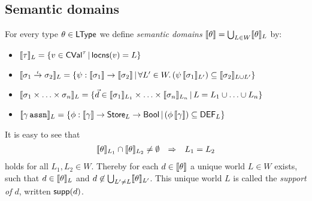 \documentclass[12pt,a4paper]{report}
\newcommand{\CVal}{\sstyle{CVal}}
\newcommand{\DEF}{\sstyle{DEF}}
\begin{document}

\subsection{Semantic domains}

\begin{definition}
  For every type $\theta\in\mathsf{LType}$ we define {\em semantic domains}
  $\llbracket\theta\rrbracket = \bigcup_{L \in W} \llbracket\theta\rrbracket_L$ by:
  \begin{itemize}
    \item $\semantic{\tau}_L = \{v\in\CVal^\tau\,|\,\locns{v} = L\}$
    \item $\llbracket\sigma_1\stackrel{_t}{\to}\sigma_2\rrbracket_L = \{\psi: \llbracket\sigma_1\rrbracket \to \llbracket\sigma_2\rrbracket\,|\,
              \forall L'\in W.\,(\psi\,\llbracket\sigma_1\rrbracket_{L'}) \subseteq \llbracket\sigma_2\rrbracket_{L \cup L'}\}$
    \item $\llbracket\sigma_1 \times \ldots \times \sigma_n\rrbracket_L =
      \{\vec{d} \in \llbracket\sigma_1\rrbracket_{L_1} \times \ldots \times \llbracket\sigma_n\rrbracket_{L_n}\,|\,
      L = L_1 \cup \ldots \cup L_n\}$
    \item $\semantic{\gamma\,\tassn}_L =
      \{\phi:\semantic{\gamma}\to\Store_L \to \Bool\,|\,(\phi\,\semantic{\gamma})\subseteq\DEF_L\}$
  \end{itemize}
\end{definition}
It is easy to see that
\[\begin{array}{rcl}
  \llbracket\theta\rrbracket_{L_1} \cap \llbracket\theta\rrbracket_{L_2} \ne \emptyset &\Rightarrow& L_1=L_2
\end{array}\]
holds for all $L_1,L_2\in W$. Thereby for each $d \in \llbracket\theta\rrbracket$ a
unique world $L \in W$ exists, such that $d \in \llbracket\theta\rrbracket_L$ and
$d \not\in \bigcup_{L'\ne L} \llbracket\theta\rrbracket_{L'}$.
This unique world $L$ is called the {\em support of $d$}, written $\mathsf{supp}(d)$.
%
\end{document}
